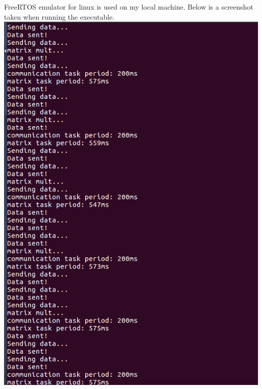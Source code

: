 \documentclass{article}
\begin{document}
FreeRTOS emulator for linux is used on my local machine. Below is a screenshot taken when running the executable.
\newline
\includegraphics[width=1\textwidth,natwidth=560,natheight=800]{priority_raised.png}
\newline

\newpage
\end{document}

